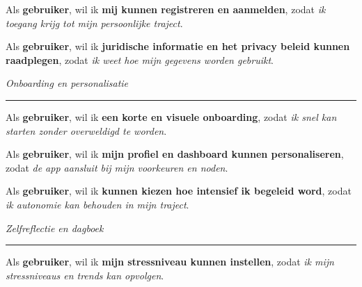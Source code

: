Als \textbf{gebruiker}, \newline
wil ik \textbf{mij kunnen registreren en aanmelden}, \newline
zodat \textit{ik toegang krijg tot mijn persoonlijke traject}.

\vspace{1em}

Als \textbf{gebruiker}, \newline
wil ik \textbf{juridische informatie en het privacy beleid kunnen raadplegen}, \newline
zodat \textit{ik weet hoe mijn gegevens worden gebruikt}.

\vspace{1em}
\vspace{1em}

\textit{Onboarding en personalisatie}
\hrule
\vspace{1em}

Als \textbf{gebruiker}, \newline
wil ik \textbf{een korte en visuele onboarding}, \newline
zodat \textit{ik snel kan starten zonder overweldigd te worden}.

\vspace{1em}

Als \textbf{gebruiker}, \newline
wil ik \textbf{mijn profiel en dashboard kunnen personaliseren}, \newline
zodat \textit{de app aansluit bij mijn voorkeuren en noden}.

\vspace{1em}

Als \textbf{gebruiker}, \newline
wil ik \textbf{kunnen kiezen hoe intensief ik begeleid word}, \newline
zodat \textit{ik autonomie kan behouden in mijn traject}.

\vspace{1em}
\vspace{1em}

\textit{Zelfreflectie en dagboek}
\hrule
\vspace{1em}

Als \textbf{gebruiker}, \newline
wil ik \textbf{mijn stressniveau kunnen instellen}, \newline
zodat \textit{ik mijn stressniveaus en trends kan opvolgen}.

\vspace{1em}

